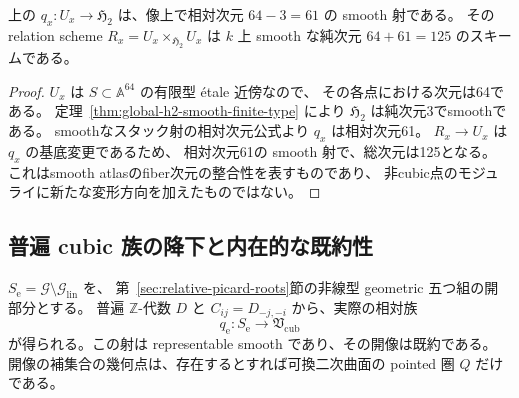 \begin{corollary}
\label{cor:noncubic-atlas-relative-dimension}
上の $q_x:U_x\to\mathfrak H_2$ は、像上で相対次元
$64-3=61$ の smooth 射である。
その relation scheme
$R_x=U_x\times_{\mathfrak H_2}U_x$ は
$k$ 上 smooth な純次元 $64+61=125$ のスキームである。
\end{corollary}
\begin{proof}
$U_x$ は $S\subset\mathbb A^{64}$ の有限型 étale 近傍なので、
その各点における次元は64である。
定理~\ref{thm:global-h2-smooth-finite-type} により
$\mathfrak H_2$ は純次元3でsmoothである。
smoothなスタック射の相対次元公式より $q_x$ は相対次元61。
$R_x\to U_x$ は $q_x$ の基底変更であるため、
相対次元61の smooth 射で、総次元は125となる。
これはsmooth atlasのfiber次元の整合性を表すものであり、
非cubic点のモジュライに新たな変形方向を加えたものではない。
\end{proof}

\subsection{普遍 cubic 族の降下と内在的な既約性}

\begin{lemma}
\label{lem:universal-nonlinear-cubic-h2-family}
$S_{\mathrm e}=\mathscr G\setminus\mathscr G_{\mathrm{lin}}$ を、
第~\ref{sec:relative-picard-roots}節の非線型 geometric 五つ組の開部分とする。
普遍 $\mathbb Z$-代数 $D$ と $C_{ij}=D_{-j,-i}$ から、実際の相対族
\[
 q_{\mathrm e}:S_{\mathrm e}\longrightarrow\mathfrak V_{\mathrm{cub}}
\]
が得られる。この射は representable smooth であり、その開像は既約である。
開像の補集合の幾何点は、存在するとすれば可換二次曲面の pointed 圏 $Q$ だけである。
\end{lemma}

